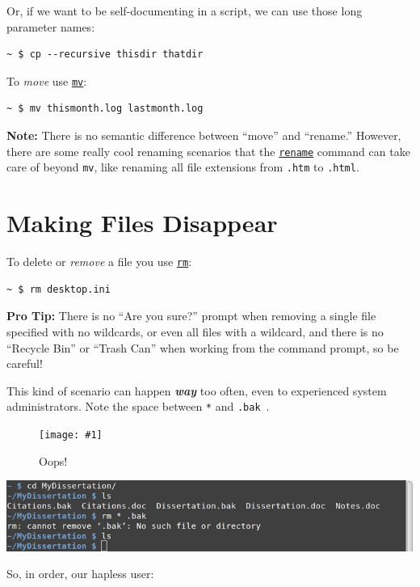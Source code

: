 \documentclass[10pt,]{book}
\numberwithin{figure}{chapter}
\DeclareRobustCommand{\fimg}[3]{
\ifxetex
\begin{figure}[H]
\texttt{[image: \#1]}
\caption{#2}
\label{fig:#3}
\end{figure}
\fi}
\DeclareRobustCommand{\fref}[1]{\ifxetex{(Figure \ref{fig:#1})}\fi}
\begin{document}
Or, if we want to be self-documenting in a script, we can use those long
parameter names:

\begin{verbatim}
~ $ cp --recursive thisdir thatdir
\end{verbatim}

To \emph{move} use \href{http://linux.die.net/man/1/mv}{\texttt{mv}}:

\begin{verbatim}
~ $ mv thismonth.log lastmonth.log
\end{verbatim}

\textbf{Note:} There is no semantic difference between ``move'' and
``rename.'' However, there are some really cool renaming scenarios that
the \href{http://linux.die.net/man/1/rename}{\texttt{rename}} command
can take care of beyond \texttt{mv}, like renaming all file extensions
from \texttt{.htm} to \texttt{.html}.

\section{Making Files Disappear}\label{making-files-disappear}

To delete or \emph{remove} a file you use
\href{http://linux.die.net/man/1/rm}{\texttt{rm}}:

\begin{verbatim}
~ $ rm desktop.ini
\end{verbatim}

\textbf{Pro Tip:} There is no ``Are you sure?'' prompt when removing a
single file specified with no wildcards, or even all files with a
wildcard, and there is no ``Recycle Bin'' or ``Trash Can'' when working
from the command prompt, so be careful!

This kind of scenario can happen \textbf{\emph{way}} too often, even to
experienced system administrators. Note the space between \texttt{*} and
\texttt{.bak}~\fref{bad-rm}.

\ifxetex\fimg{./images/bad-rm.png}{Oops!}{bad-rm} \else
\includegraphics{./images/bad-rm.png} \fi

So, in order, our hapless user:
\end{document}
